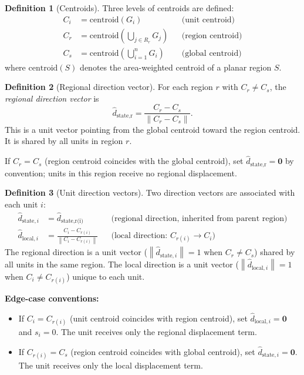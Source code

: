 \documentclass[12pt, a4paper]{article}
\numberwithin{equation}{section}
\theoremstyle{definition}
\newtheorem{definition}{Definition}[section]
\theoremstyle{plain}
\theoremstyle{remark}
\newcommand{\norm}[1]{\left\|#1\right\|}
\newcommand{\dhat}[1]{\hat{d}_{\text{#1}}}
\newcommand{\dhati}[1]{\hat{d}_{\text{#1},i}}
\begin{document}
\begin{definition}[Centroids]
\label{def:centroids}
Three levels of centroids are defined:
\begin{align}
  C_i &= \mathrm{centroid}(G_i) && \text{(unit centroid)} \label{eq:ci} \\
  C_r &= \mathrm{centroid}\!\left(\bigcup_{j \in R_r} G_j\right) && \text{(region centroid)} \label{eq:cr} \\
  C_s &= \mathrm{centroid}\!\left(\bigcup_{i=1}^{n} G_i\right) && \text{(global centroid)} \label{eq:cs}
\end{align}
where $\mathrm{centroid}(S)$ denotes the area-weighted centroid of a planar region $S$.
\end{definition}

\begin{definition}[Regional direction vector]
\label{def:dir_region}
For each region $r$ with $C_r \neq C_s$, the \emph{regional direction vector} is
\begin{equation}
  \dhat{state,r} = \frac{C_r - C_s}{\norm{C_r - C_s}}.
  \label{eq:dstate_r}
\end{equation}
This is a unit vector pointing from the global centroid toward the region centroid. It is shared by all units in region $r$.

If $C_r = C_s$ (region centroid coincides with the global centroid), set $\dhat{state,r} = \mathbf{0}$ by convention; units in this region receive no regional displacement.
\end{definition}

\begin{definition}[Unit direction vectors]
\label{def:directions}
Two direction vectors are associated with each unit $i$:
\begin{align}
  \dhati{state} &= \dhat{state,r(i)} && \text{(regional direction, inherited from parent region)} \label{eq:dstate} \\[6pt]
  \dhati{local} &= \frac{C_i - C_{r(i)}}{\norm{C_i - C_{r(i)}}} && \text{(local direction: $C_{r(i)} \to C_i$)} \label{eq:dlocal}
\end{align}
The regional direction is a unit vector ($\norm{\dhati{state}} = 1$ when $C_r \neq C_s$) shared by all units in the same region. The local direction is a unit vector ($\norm{\dhati{local}} = 1$ when $C_i \neq C_{r(i)}$) unique to each unit.

\medskip\noindent\textbf{Edge-case conventions:}
\begin{itemize}
  \item If $C_i = C_{r(i)}$ (unit centroid coincides with region centroid), set $\dhati{local} = \mathbf{0}$ and $s_i = 0$. The unit receives only the regional displacement term.
  \item If $C_{r(i)} = C_s$ (region centroid coincides with global centroid), set $\dhati{state} = \mathbf{0}$. The unit receives only the local displacement term.
\end{itemize}
\end{definition}
\end{document}

